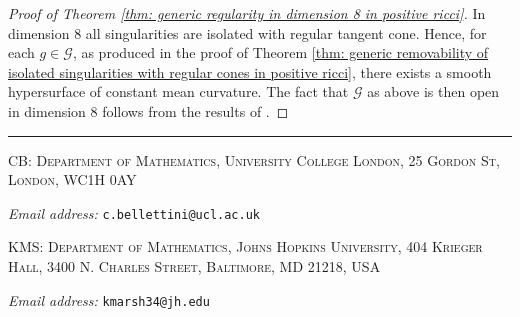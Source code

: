 \documentclass[11pt]{article}
\makeatletter
\newcommand{\Addresses}{{%
  \bigskip
  \footnotesize

  CB: \textsc{Department of Mathematics, University College London, 25 Gordon St, London, WC1H 0AY}\par\nopagebreak
  \textit{Email address:} \texttt{c.bellettini@ucl.ac.uk}

  \medskip

  KMS: \textsc{Department of Mathematics, Johns Hopkins University, 404 Krieger Hall, 3400 N. Charles Street, Baltimore, MD 21218, USA}\par\nopagebreak
  \textit{Email address:} \texttt{kmarsh34@jh.edu}
}}
\makeatother
\begin{document}
\begin{proof}[Proof of Theorem \ref{thm: generic regularity in dimension 8 in positive ricci}]
In dimension $8$ all singularities are isolated with regular tangent cone. Hence, for each $g \in \mathcal{G}$, as produced in the proof of Theorem \ref{thm: generic removability of isolated singularities with regular cones in positive ricci}, there exists a smooth hypersurface of constant mean curvature. The fact that $\mathcal{G}$ as above is then open in dimension $8$ follows from the results of \cite[Section 7]{White1991}.
\end{proof}



 
 
\hrule
\Addresses
\end{document}
